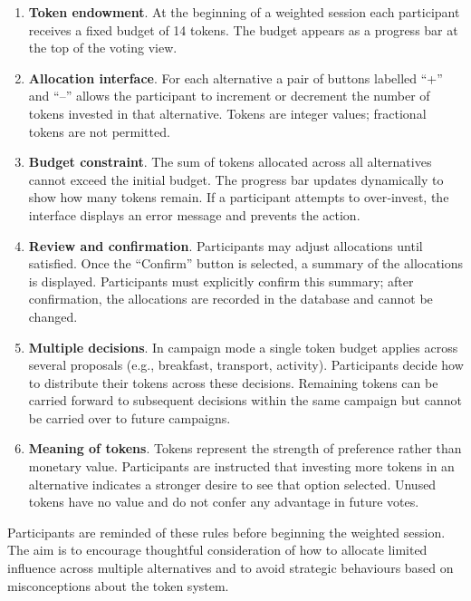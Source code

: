 \begin{enumerate}
    \item \textbf{Token endowment}.  At the beginning of a weighted
    session each participant receives a fixed budget of 14 tokens.  The
    budget appears as a progress bar at the top of the voting view.
    \item \textbf{Allocation interface}.  For each alternative a pair
    of buttons labelled “+” and “–” allows the participant to increment
    or decrement the number of tokens invested in that alternative.
    Tokens are integer values; fractional tokens are not permitted.
    \item \textbf{Budget constraint}.  The sum of tokens allocated across
    all alternatives cannot exceed the initial budget.  The progress bar
    updates dynamically to show how many tokens remain.  If a participant
    attempts to over‑invest, the interface displays an error message and
    prevents the action.
    \item \textbf{Review and confirmation}.  Participants may adjust
    allocations until satisfied.  Once the “Confirm” button is
    selected, a summary of the allocations is displayed.  Participants
    must explicitly confirm this summary; after confirmation, the
    allocations are recorded in the database and cannot be changed.
    \item \textbf{Multiple decisions}.  In campaign mode a single token
    budget applies across several proposals (e.g., breakfast, transport,
    activity).  Participants decide how to distribute their tokens
    across these decisions.  Remaining tokens can be carried forward to
    subsequent decisions within the same campaign but cannot be carried
    over to future campaigns.
    \item \textbf{Meaning of tokens}.  Tokens represent the strength of
    preference rather than monetary value.  Participants are instructed
    that investing more tokens in an alternative indicates a stronger
    desire to see that option selected.  Unused tokens have no value
    and do not confer any advantage in future votes.
\end{enumerate}

Participants are reminded of these rules before beginning the weighted
session.  The aim is to encourage thoughtful consideration of how to
allocate limited influence across multiple alternatives and to avoid
strategic behaviours based on misconceptions about the token system.
